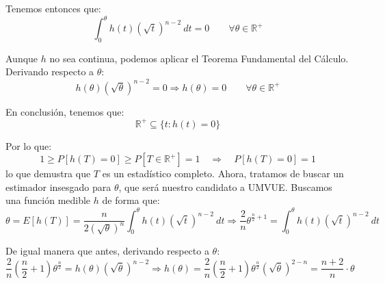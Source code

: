\begin{ejercicio}
    Tenemos entonces que:
    \begin{equation*}
        \int_{0}^{\theta} h(t){\left(\sqrt{t}\right)}^{n-2}~dt = 0 \qquad \forall \theta\in \mathbb{R}^+
    \end{equation*}
    
    Aunque $h$ no sea continua, podemos aplicar el Teorema Fundamental del Cálculo. Derivando respecto a $\theta$:
    \begin{equation*}
        h(\theta) {\left(\sqrt{\theta}\right)}^{n-2} = 0 \Longrightarrow h(\theta) = 0 \qquad \forall \theta\in \mathbb{R}^+
    \end{equation*}

    En conclusión, tenemos que:
    \begin{equation*}
        \mathbb{R}^+ \subseteq \{t:h(t) = 0\}
    \end{equation*}

    Por lo que:
    \begin{equation*}
        1 \geq P[h(T) = 0] \geq P[T\in \mathbb{R}^+] = 1 \quad \Longrightarrow \quad P[h(T)=0] = 1
    \end{equation*}
    lo que demustra que $T$ es un estadístico completo. Ahora, tratamos de buscar un estimador insesgado para $\theta$, que será nuestro candidato a UMVUE. Buscamos una función medible $h$ de forma que:
    \begin{equation*}
        \theta = E[h(T)] = \dfrac{n}{2{\left(\sqrt{\theta}\right)}^{n}}\int_{0}^{\theta} h(t){\left(\sqrt{t}\right)}^{n-2}~dt 
        \Longrightarrow
        \dfrac{2}{n}{\theta}^{\frac{n}{2}+1} = \int_{0}^{\theta} h(t){\left(\sqrt{t}\right)}^{n-2}~dt
    \end{equation*}
    
    De igual manera que antes, derivando respecto a $\theta$:
    \begin{equation*}
        \frac{2}{n}\left(\frac{n}{2}+1\right){\theta}^{\frac{n}{2}} = h(\theta){\left(\sqrt{\theta}\right)}^{n-2} \Longrightarrow h(\theta) = \dfrac{2}{n}\left(\frac{n}{2}+1\right){\theta}^{\frac{n}{2}}{\left(\sqrt{\theta}\right)}^{2-n} = \dfrac{n+2}{n}\cdot \theta
    \end{equation*}


\end{ejercicio}
